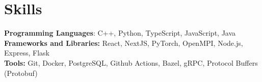 \documentclass[11pt]{article}
\begin{document}
\section{Skills}
  \quad\small{\textbf{Programming Languages}: C++, Python, TypeScript, JavaScript, Java}\\\vspace{0.2em}
  \quad\small{\textbf{Frameworks and Libraries:} React, NextJS, PyTorch, OpenMPI, Node.js, Express, Flask}\\\vspace{0.2em}
  \quad\small{\textbf{Tools:} Git, Docker, PostgreSQL, Github Actions, Bazel, gRPC, Protocol Buffers (Protobuf)}\\\vspace{0.2em}
\end{document}
